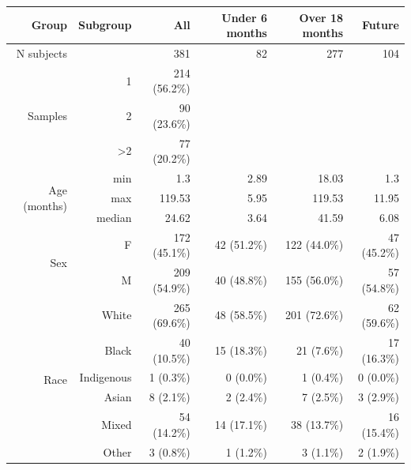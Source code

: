 \documentclass{article}
\begin{document}
\begin{table}[!h]
    \centering
    \begin{tabular}{|r|r|r|r|r|r|}
      \hline\hline
      \textbf{Group}              & \textbf{Subgroup}        & \textbf{All} & \textbf{Under 6 months} & \textbf{Over 18 months} & \textbf{Future} \\\hline
      N subjects                  &                          & 381 & 82 & 277 & 104 \\  \hline
    \multirow{3}{*}{Samples}      & 1                        & 214 (56.2\%) &  &  &  \\ \cline{2-6}
                                  & 2                        & 90 (23.6\%) &  &  &  \\ \cline{2-6}
                                  & \textgreater 2           & 77 (20.2\%) &  &  &  \\ \hline
    \multirow{3}{*}{Age (months)} & min                      & 1.3 & 2.89 & 18.03 & 1.3 \\ \cline{2-6}
                                  & max                      & 119.53 & 5.95 & 119.53 & 11.95 \\ \cline{2-6}
                                  & median                   & 24.62 & 3.64 & 41.59 & 6.08 \\ \hline
    \multirow{2}{*}{Sex}          & F                        & 172 (45.1\%) & 42 (51.2\%) & 122 (44.0\%) & 47 (45.2\%) \\   \cline{2-6}
                                  & M                        & 209 (54.9\%) & 40 (48.8\%) & 155 (56.0\%) & 57 (54.8\%) \\  \hline
    \multirow{6}{*}{Race}         & White                    & 265 (69.6\%) & 48 (58.5\%) & 201 (72.6\%) & 62 (59.6\%) \\   \cline{2-6}
                                  & Black                    & 40 (10.5\%) & 15 (18.3\%) & 21 (7.6\%) & 17 (16.3\%) \\ \cline{2-6}
                                  & Indigenous               & 1 (0.3\%) & 0 (0.0\%) & 1 (0.4\%) & 0 (0.0\%) \\ \cline{2-6}
                                  & Asian                    & 8 (2.1\%) & 2 (2.4\%) & 7 (2.5\%) & 3 (2.9\%) \\ \cline{2-6}
                                  & Mixed                    & 54 (14.2\%) & 14 (17.1\%) & 38 (13.7\%) & 16 (15.4\%) \\ \cline{2-6}
                                  & Other                    & 3 (0.8\%) & 1 (1.2\%) & 3 (1.1\%) & 2 (1.9\%) \\ \hline

\end{tabular}
\end{table}
\end{document}
